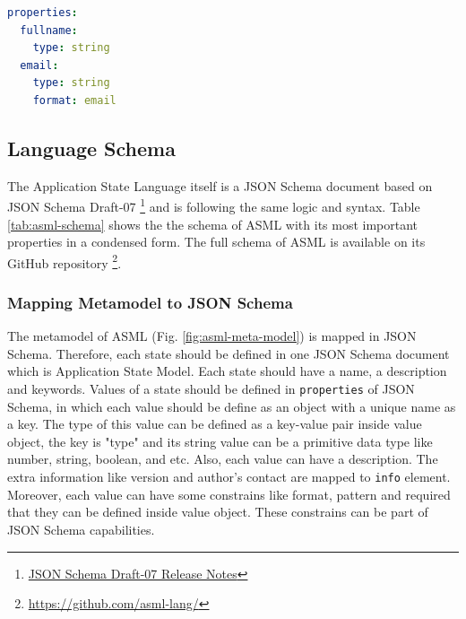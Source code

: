 \lstset{
  label=lis:yaml-simple, caption=Example of expressing JSON Schema in YAML syntax., 
}
\begin{lstlisting}[language=yaml]
properties:
  fullname:
    type: string
  email:
    type: string
    format: email
\end{lstlisting}


\subsection{Language Schema}
The Application State Language itself is a JSON Schema document based on JSON Schema Draft-07
\footnote{\href{https://json-schema.org/draft-07/json-schema-release-notes.html}{JSON Schema Draft-07 Release Notes}}
and is following the same logic and syntax. Table \ref{tab:asml-schema} shows the the schema of ASML with its most important properties in a condensed form. 
The full schema of ASML is available on its GitHub repository
\footnote{\href{https://github.com/asml-lang/asml/blob/master/schemas/schema.json}{https://github.com/asml-lang/}}.

\subsubsection{Mapping Metamodel to JSON Schema}
The metamodel of ASML (Fig. \ref{fig:asml-meta-model}) is mapped in JSON Schema. Therefore, each state should be defined in one JSON Schema document which is Application State Model. Each state should have a name, a description and keywords. Values of a state should be defined in \lstinline[basicstyle=\ttfamily]{properties} of JSON Schema, in which each value should be define as an object with a unique name as a key. The type of this value can be defined as a key-value pair inside value object, the key is "type" and its string value can be a primitive data type like number, string, boolean, and etc. Also, each value can have a description. The extra information like version and author’s contact are mapped to \lstinline[basicstyle=\ttfamily]{info} element. Moreover, each value can have some constrains like format, pattern and required that they can be defined inside value object. These constrains can be part of JSON Schema capabilities.

